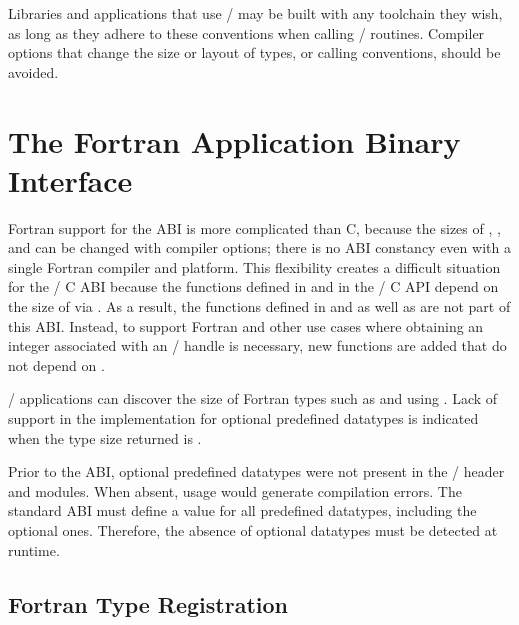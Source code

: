 \begin{users}
Libraries and applications that use \MPI/ may be built with any toolchain they wish, 
as long as they adhere to these conventions when calling \MPI/ routines. 
Compiler options that change the size or layout of types, or calling conventions, 
should be avoided.
\end{users}

\section{The Fortran Application Binary Interface}
\label{sec:fortran-abi}

Fortran support for the ABI is more complicated than C,
because the sizes of , ,
and  can be changed with compiler options;
there is no ABI constancy even with a single Fortran compiler and platform.
This flexibility creates a difficult situation for the \MPI/ C ABI
because the functions defined in 
and  in the \MPI/ C API
depend on the size of  via .
As a result, the functions defined in 
and  
as well as  are not part of this ABI.
Instead, to support Fortran and other use cases where obtaining an
integer associated with an \MPI/ handle is necessary, new functions are
added that do not depend on .

\MPI/ applications can discover the size of Fortran types such as
 and  using .
Lack of support in the implementation for optional predefined datatypes
is indicated when the type size returned is
. %

\begin{rationale}
Prior to the ABI, optional predefined datatypes were not present in the \MPI/ header and modules.
When absent, usage would generate compilation errors.
The standard ABI must define a value for all predefined datatypes, including the optional ones.
Therefore, the absence of optional datatypes must be detected at runtime.
\end{rationale}

\subsection{Fortran Type Registration}
\label{subsec:fortran-type-registration}

